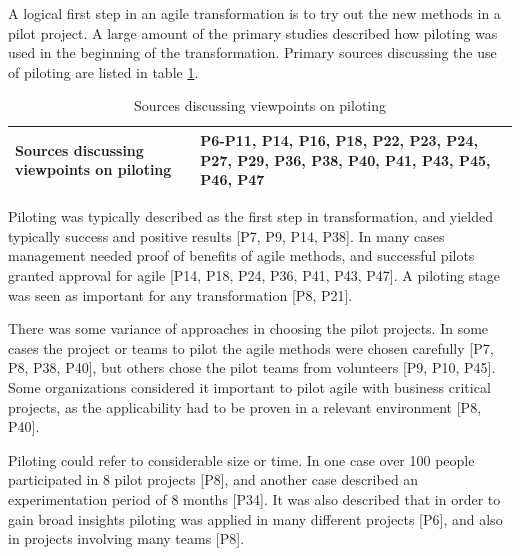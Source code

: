 
A logical first step in an agile transformation is to try out the new methods in
a pilot project. A large amount of the primary studies described how piloting
was used in the beginning of the transformation. Primary sources discussing
the use of piloting are listed in table \ref{table:transformation_piloting}. 

\begin{table}[h]
    \centering
    \begin{tabular}{ >{\raggedright\arraybackslash}p{}
                     >{\raggedright\arraybackslash}p{} }
        \toprule
        Sources discussing viewpoints on piloting   & 
                P6-P11, P14, P16, P18, P22, P23, P24, P27, P29,
                P36, P38, P40, P41, P43, P45, P46, P47  \\
        \bottomrule
    \end{tabular}
    \caption{Sources discussing viewpoints on piloting}
    \label{table:transformation_piloting}
\end{table}

Piloting was typically described as the first step in transformation, and
yielded typically success and positive results [P7, P9, P14, P38]. In many cases
management needed proof of benefits of agile methods, and successful pilots
granted approval for agile [P14, P18, P24, P36, P41, P43, P47].
A piloting stage was seen as important for any transformation [P8, P21].


There was some variance of approaches in choosing the pilot projects.
In some cases the project or teams to pilot the agile methods were chosen
carefully [P7, P8, P38, P40], but others chose the pilot teams from volunteers
[P9, P10, P45].
Some organizations considered it important to pilot agile with business critical
projects, as the applicability had to be proven in a relevant environment [P8,
P40].

Piloting could refer to considerable size or time. In one case over 100 people
participated in 8 pilot projects [P8], and another case described an
experimentation period of 8 months [P34].
It was also described that in order to gain broad insights piloting was applied
in many different projects [P6], and also in projects involving many teams [P8].

